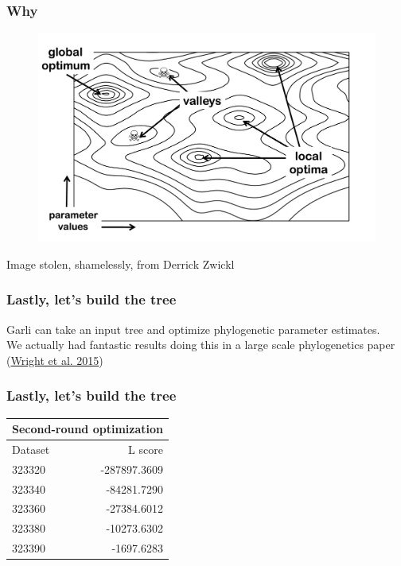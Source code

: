 \documentclass{beamer}
\begin{document}
\begin{frame}
\frametitle{Why}
\begin{figure}
    \includegraphics[scale=0.35]{valleyodeath}
    \end{figure}
\centerline{Image stolen, shamelessly, from Derrick Zwickl}
\end{frame}



\begin{frame}
\frametitle{Lastly, let's build the tree}
Garli can take an input tree and optimize phylogenetic parameter estimates. \\
We actually had fantastic results doing this in a large scale phylogenetics paper (\href{http://onlinelibrary.wiley.com/doi/10.1002/jez.b.22642/full}{Wright et al. 2015})
\end{frame}

\begin{frame}
\frametitle{Lastly, let's build the tree}
\begin{center}
\begin{tabular}{ l  | r }
  \multicolumn{2}{c}{Second-round optimization} \\
\hline
    Dataset & L score  \\
\hline
  323320 & -287897.3609  \\
  323340 & -84281.7290 \\
  323360 & -27384.6012\\
  323380 & -10273.6302\\
  323390 & -1697.6283\\
\end{tabular}
\end{center}
\end{frame}
\end{document}
